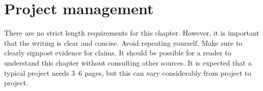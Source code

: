 \chapter{Project management}
\label{chap:project-management}


\begin{length}
There are no strict length requirements for this chapter.  However, it is important that the writing is clear and concise.  Avoid repeating yourself.  Make sure to clearly signpost evidence for claims.  It should be possible for a reader to understand this chapter without consulting other sources.  It is expected that a typical project needs 3--6 pages, but this can vary considerably from project to project.
\end{length}

